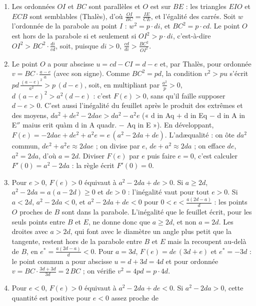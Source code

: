 \documentclass[11pt,a4paper]{article}
\begin{document}
\begin{solution}
\begin{enumerate}
\item Les ordonnées $OI$ et $BC$ sont parallèles et $O$ est sur $BE$ : les
  triangles $EIO$ et $ECB$ sont semblables (Thalès), d'où
  $\frac{OI}{BC} = \frac{IE}{CE}$, et l'égalité des carrés. Soit $w$ l'ordonnée
  de la parabole au point $I$ : $w^2 = p \cdot di$, et $BC^2 = p \cdot cd$. Le
  point $O$ est hors de la parabole si et seulement si $OI^2 > p \cdot di$,
  c'est-à-dire $OI^2 > BC^2 \cdot \frac{di}{cd}$, soit, puisque $di > 0$,
  $\frac{cd}{di} > \frac{BC^2}{OI^2}$.
\item Le point $O$ a pour abscisse $u = cd - CI = d - e$ et, par Thalès, pour
  ordonnée $v = BC \cdot \frac{a - e}{a}$ (avec son signe). Comme
  $BC^2 = pd$, la condition $v^2 > pu$ s'écrit
  $pd\,\frac{(a-e)^2}{a^2} > p\,(d - e)$, soit, en multipliant par
  $\frac{a^2}{p} > 0$, $d\,(a - e)^2 > a^2(d - e)$ : c'est $F(e) > 0$, sans
  qu'il faille supposer $d - e > 0$. C'est aussi l'inégalité du feuillet après
  le produit des extrêmes et des moyens,
  $da^2 + de^2 - 2dae > da^2 - a^2e$ (« d in Aq $+$ d in Eq $-$ d in A in
  E$''$ maius erit quàm d in A quadr. $-$ Aq in E »). En développant,
  $F(e) = -2dae + de^2 + a^2e = e\,(a^2 - 2da + de)$. L'adæqualité : on ôte
  $da^2$ commun, $de^2 + a^2e \approx 2dae$ ; on divise par $e$,
  $de + a^2 \approx 2da$ ; on efface $de$, $a^2 = 2da$, d'où $a = 2d$. Diviser
  $F(e)$ par $e$ puis faire $e = 0$, c'est calculer
  $F'(0) = a^2 - 2da$ : la règle écrit $F'(0) = 0$.
\item Pour $e > 0$, $F(e) > 0$ équivaut à $a^2 - 2da + de > 0$. Si $a \ge 2d$,
  $a^2 - 2da = a(a - 2d) \ge 0$ et $de > 0$ : l'inégalité vaut pour tout
  $e > 0$. Si $a < 2d$, $a^2 - 2da < 0$, et $a^2 - 2da + de < 0$ pour
  $0 < e < \frac{a(2d - a)}{d}$ : les points $O$ proches de $B$ sont dans la
  parabole. L'inégalité que le feuillet écrit, pour les seuls points entre $B$
  et $E$, ne donne donc que $a \ge 2d$, et non $a = 2d$. Les droites avec
  $a > 2d$, qui font avec le diamètre un angle plus petit que la tangente, restent hors de la
  parabole entre $B$ et $E$ mais la recoupent au-delà de $B$, en
  $e^* = \frac{a(2d - a)}{d} < 0$. Pour $a = 3d$,
  $F(e) = de\,(3d + e)$ et $e^* = -3d$ : le point commun a pour abscisse
  $u = d + 3d = 4d$ et pour ordonnée $v = BC \cdot \frac{3d + 3d}{3d} = 2\,BC$ ;
  on vérifie $v^2 = 4pd = p \cdot 4d$.
\item Pour $e < 0$, $F(e) > 0$ équivaut à $a^2 - 2da + de < 0$. Si
  $a^2 - 2da > 0$, cette quantité est positive pour $e < 0$ assez proche de

\end{enumerate}
\end{solution}
\end{document}
